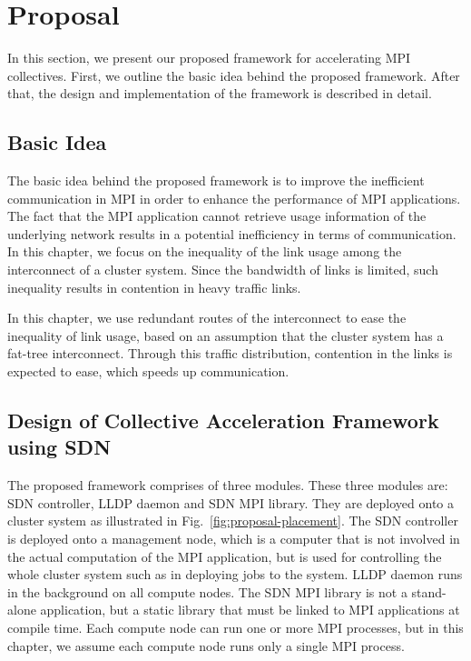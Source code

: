 \section{Proposal}\label{sec:iii-proposal}

In this section, we present our proposed framework for accelerating MPI
collectives. First, we outline the basic idea behind the proposed framework.
After that, the design and implementation of the framework is described in
detail.

\subsection{Basic Idea}

The basic idea behind the proposed framework is to improve the
inefficient communication in MPI in order to enhance the performance of
MPI applications. The fact that the MPI application cannot retrieve
usage information of the underlying network results in a potential
inefficiency in terms of communication. In this chapter, we focus on the
inequality of the link usage among the interconnect of a cluster system. Since
the bandwidth of links is limited, such inequality results in contention in
heavy traffic links.

In this chapter, we use redundant routes of the interconnect to ease the
inequality of link usage, based on an assumption that the cluster system has a
fat-tree interconnect. Through this traffic distribution, contention in the
links is expected to ease, which speeds up communication.

\subsection{Design of Collective Acceleration Framework using SDN}

The proposed framework comprises of three modules. These three modules are:
SDN controller, LLDP daemon and SDN MPI library. They are deployed onto a
cluster system as illustrated in Fig.~\ref{fig:proposal-placement}. The SDN
controller is deployed onto a management node, which is a computer that is not
involved in the actual computation of the MPI application, but is used for
controlling the whole cluster system such as in deploying jobs to the system.
LLDP daemon runs in the background on all compute nodes. The SDN MPI library
is not a stand-alone application, but a static library that must be linked to
MPI applications at compile time. Each compute node can run one or more MPI
processes, but in this chapter, we assume each compute node runs only a single
MPI process.

